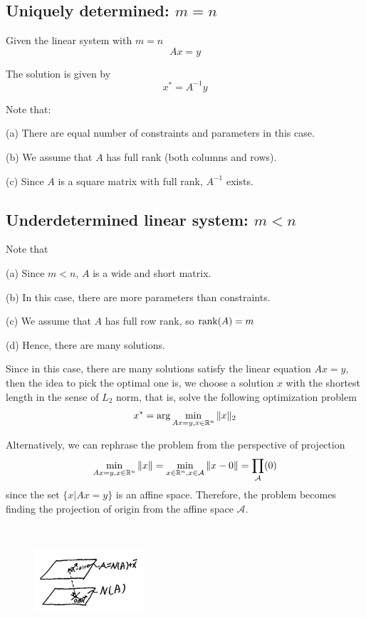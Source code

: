 \subsection{Uniquely determined: $m =n$}
Given the linear system with $m=n$
$$Ax = y$$

The solution is given by
$$x^* = A^{-1}y$$

Note that:

(a) There are equal number of constraints and parameters in this case.

(b) We assume that $A$ has full rank (both columns and rows).
	
(c) Since $A$ is a square matrix with full rank, $A^{-1}$ exists.



\subsection{Underdetermined linear system: $m<n$ }

Note that

	(a) Since $m<n$, $A$ is a wide and short matrix.
	
	(b) In this case, there are more parameters than constraints.
	
	(c) We assume that $A$ has full row rank, so $\operatorname{rank}(A) = m$
	
	(d) Hence, there are many solutions.

\vspace{0.3cm}

Since in this case, there are many solutions satisfy the linear equation $Ax=y$, then the idea to pick the optimal one is, we choose a solution $x$  with the shortest length in the sense of $L_2$ norm, that is, solve the following optimization problem
$$x^* = \arg  \min_{Ax = y, x\in \mathbb{R}^n}\Vert x\Vert _2$$

Alternatively, we can rephrase the problem from the perspective of projection
\begin{equation*}
\min_{Ax = y, x\in \mathbb{R}^n}\Vert x\Vert  = \min_{x\in \mathbb{R}^n, x\in \mathcal{A}}\Vert x - 0\Vert  = \prod_{\mathcal{A}}(0)
\end{equation*}
since the set $\{x | Ax= y \}$ is an affine space. Therefore, the problem becomes finding the projection of origin from the affine space $\mathcal{A}$.



\begin{figure}
	\centering
	\includegraphics[width=1.6in,height=1.6in]{figures/ch06/figure3.png}
\end{figure}

